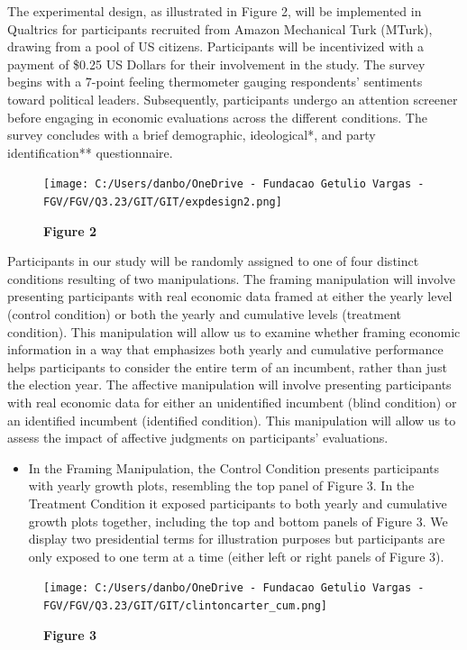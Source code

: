 \documentclass[
]{article}
\providecommand{\tightlist}{%
  \setlength{\itemsep}{0pt}\setlength{\parskip}{0pt}}
\begin{document}
The experimental design, as illustrated in Figure 2, will be implemented
in Qualtrics for participants recruited from Amazon Mechanical Turk
(MTurk), drawing from a pool of US citizens. Participants will be
incentivized with a payment of \$0.25 US Dollars for their involvement
in the study. The survey begins with a 7-point feeling thermometer
gauging respondents' sentiments toward political leaders. Subsequently,
participants undergo an attention screener before engaging in economic
evaluations across the different conditions. The survey concludes with a
brief demographic, ideological*, and party identification**
questionnaire.

\begin{figure}
\centering
\texttt{[image: C:/Users/danbo/OneDrive - Fundacao Getulio Vargas - FGV/FGV/Q3.23/GIT/GIT/expdesign2.png]}
\caption{\textbf{Figure 2}}
\end{figure}

Participants in our study will be randomly assigned to one of four
distinct conditions resulting of two manipulations. The framing
manipulation will involve presenting participants with real economic
data framed at either the yearly level (control condition) or both the
yearly and cumulative levels (treatment condition). This manipulation
will allow us to examine whether framing economic information in a way
that emphasizes both yearly and cumulative performance helps
participants to consider the entire term of an incumbent, rather than
just the election year. The affective manipulation will involve
presenting participants with real economic data for either an
unidentified incumbent (blind condition) or an identified incumbent
(identified condition). This manipulation will allow us to assess the
impact of affective judgments on participants' evaluations.

\begin{itemize}
\tightlist
\item
  In the Framing Manipulation, the Control Condition presents
  participants with yearly growth plots, resembling the top panel of
  Figure 3. In the Treatment Condition it exposed participants to both
  yearly and cumulative growth plots together, including the top and
  bottom panels of Figure 3. We display two presidential terms for
  illustration purposes but participants are only exposed to one term at
  a time (either left or right panels of Figure 3).
\end{itemize}

\begin{figure}
\centering
\texttt{[image: C:/Users/danbo/OneDrive - Fundacao Getulio Vargas - FGV/FGV/Q3.23/GIT/GIT/clintoncarter\_cum.png]}
\caption{\textbf{Figure 3}}
\end{figure}
\end{document}
